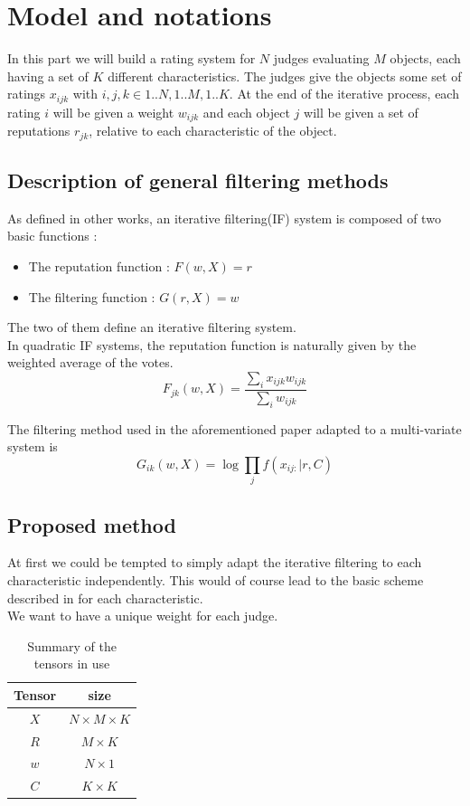 \documentclass[12pt,a4paper]{article}
\begin{document}
\section{Model and notations}
In this part we will build a rating system for $N$ judges evaluating $M$ objects, each having a set of $K$ different characteristics. 
The judges give the objects some set of ratings $x_{ijk}$ with $i,j,k \in {1..N},{1..M},{1..K}$.
At the end of the iterative process, each rating $i$ will be given a weight $w_{ijk}$ and each object $j$ will be given a set of reputations $r_{jk}$, relative to each characteristic of the object.


\subsection{Description of general filtering methods}
As defined in other works, an iterative filtering(IF) system is composed of two basic functions \cite{Cristo1} : 
\begin{itemize}
\item The reputation function : $F(w,X)=r$
\item The filtering function : $G(r,X)=w$
\end{itemize}
The two of them define an iterative filtering system.\\
In quadratic IF systems, the reputation function is naturally given by the weighted average of the votes.
$$F_{jk}(w,X) = \frac{\sum_{i}x_{ijk}w_{ijk}}{\sum_i w_{ijk}}$$

The filtering method used in the aforementioned paper adapted to a multi-variate system is 
$$G_{ik}(w,X) = \log \prod_j f(x_{ij:}|r,C)$$


\subsection{Proposed method}
At first we could be tempted to simply adapt the iterative filtering to each characteristic independently. This would of course lead to the basic scheme described in \cite{Cristo1} for each characteristic.\\
We want to have a unique weight for each judge. 

\begin{table}
\centering
\begin{tabular}{|c|c|}
\hline 
Tensor & size\\
\hline
$X$ & $N\times M \times K$\\
\hline
$R$ & $M\times K$\\
\hline
$w$ & $N\times 1$\\
\hline
$C$ & $K\times K$\\
\hline
\end{tabular}
\caption{Summary of the tensors in use}
\end{table}
\end{document}
